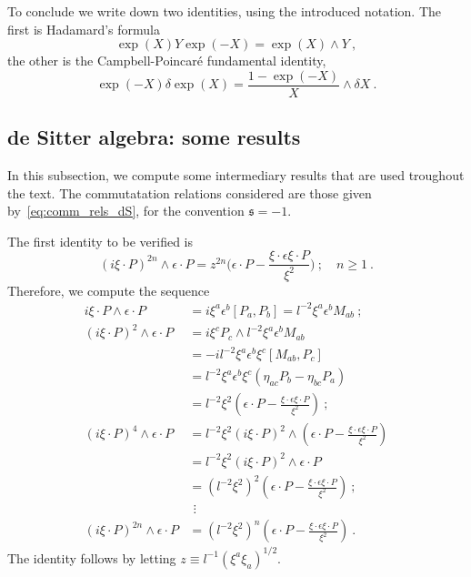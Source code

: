\documentclass[11pt]{article}
\begin{document}
To conclude we write down two identities, using the introduced 
notation.  The first is Hadamard's formula
%
\begin{equation}\label{eq:Had}
	\exp(X) Y \exp(-X) = \exp(X) \wedge Y~,
\end{equation}
the other is the Campbell-Poincar\'e fundamental identity,
\begin{equation}\label{eq:CP}
	\exp(-X) \delta\exp(X) = \frac{1-\exp(-X)}{X}\wedge \delta X~.
\end{equation}

\subsection{de Sitter algebra: some results}
\label{app:nested_comm.dS_results}
In this subsection, we compute some intermediary results that are 
used troughout the text. The commutatation relations considered 
are those given by~\eqref{eq:comm_rels_dS}, for the convention 
$\mathfrak{s} = -1$.

The first identity to be verified is
%
\begin{equation}\label{eq:id_dS_comm.1}
	(i\xi\cdot P)^{2n} \wedge \epsilon\cdot P = z^{2n} 
	\bigg(\epsilon\cdot P - \frac{\xi\cdot\epsilon \xi\cdot 
		P}{\xi^2} \bigg)~;\quad n \geqslant 1~.
\end{equation}
Therefore, we compute the sequence
\begin{align*}
	i\xi\cdot P \wedge \epsilon\cdot P
	&= i\xi^a\epsilon^b [P_a,P_b] = l^{-2} \xi^a\epsilon^b 
	M_{ab}~;
	\\
	(i\xi\cdot P)^2 \wedge \epsilon\cdot P
	&= i\xi^c P_c \wedge l^{-2} \xi^a\epsilon^b M_{ab} \\
	&= -il^{-2} \xi^a\epsilon^b\xi^c [M_{ab},P_c] \\
	&= l^{-2}\xi^a\epsilon^b\xi^c (\eta_{ac}P_b - \eta_{bc}P_a) \\
	&= l^{-2} \xi^2 \left(\epsilon\cdot P - \frac{\xi\cdot\epsilon 
			\xi\cdot P}{\xi^2} \right)~;
	\\
	(i\xi\cdot P)^4 \wedge \epsilon\cdot P
	&= l^{-2}\xi^2(i\xi\cdot P)^2 \wedge \left(\epsilon\cdot P - 
		\frac{\xi\cdot\epsilon \xi\cdot P}{\xi^2} \right) \\
	&= l^{-2}\xi^2(i\xi\cdot P)^2 \wedge \epsilon\cdot P \\
	&= (l^{-2}\xi^2)^2 \left(\epsilon\cdot P - 
		\frac{\xi\cdot\epsilon \xi\cdot P}{\xi^2} \right)~; \\
	&~\,\vdots
	\\
	(i\xi\cdot P)^{2n} \wedge \epsilon\cdot P
	&= (l^{-2}\xi^2)^n \left(\epsilon\cdot P - 
		\frac{\xi\cdot\epsilon \xi\cdot P}{\xi^2} \right)~.
\end{align*}
The identity follows by letting $z \equiv 
l^{-1}(\xi^a\xi_a)^{1/2}$.
\end{document}
